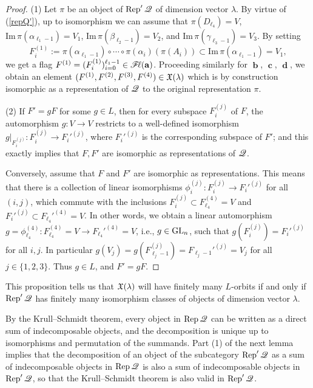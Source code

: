 \documentclass[12pt,reqno]{amsart}
\begin{document}
\begin{proof}
(1) Let $\pi$ be an object of $\Rep'\quiver$ of dimension vector $\lambda$.
By virtue of (\ref{repQ'}), up to isomorphism we can assume that $\pi(D_{\ell_4})=V$, $\mathrm{Im}\,\pi(\alpha_{\ell_1-1})=V_1$,
$\mathrm{Im}\,\pi(\beta_{\ell_2-1})=V_2$,
and $\mathrm{Im}\,\pi(\gamma_{\ell_3-1})=V_3$.
By setting
$$
F_i^{(1)}:=\pi(\alpha_{\ell_1-1})\circ\cdots\circ\pi(\alpha_i)(\pi(A_i))\subset\mathrm{Im}\,\pi(\alpha_{\ell_1-1})=V_1,
$$
we get a flag $F^{(1)}=(F_i^{(1)})_{i=0}^{\ell_1-1}\in\mathscr{F}\!\ell(\mathbf{a})$.
Proceeding similarly for $\mbfb$, $\mbfc$, $\mbfd$, we obtain an element $(F^{(1)},F^{(2)},F^{(3)},F^{(4)})\in\mathfrak{X}(\lambda)$ which is by construction isomorphic as a representation of $\mathscr{Q}$ to the original representation $\pi$.

(2)
If $F'=g F$ for some $g\in L$, then for every subspace $F_i^{(j)}$ of $F$,
the automorphism $g:V\to V$ restricts to a well-defined isomorphism $g|_{F_i^{(j)}}:F_i^{(j)}\to F_i'^{(j)}$,
where $F_i'^{(j)}$ is the corresponding subspace of $F'$;
and this exactly implies that $F,F'$ are isomorphic as representations of $\mathscr{Q}$.

Conversely, assume that $F$ and $F'$ are isomorphic as representations.
This means that there is a collection of linear isomorphisms
$\phi_i^{(j)}:F_i^{(j)}\to F_i'^{(j)}$ for all $(i,j)$,
which commute with the inclusions $F_i^{(j)}\subset F_{\ell_4}^{(4)}=V$ and $F_i'^{(j)}\subset F_{\ell_4}'^{(4)}=V$.
In other words, we obtain a linear automorphism $g=\phi_{\ell_4}^{(4)}:F_{\ell_4}^{(4)}=V\to F_{\ell_4}'^{(4)}=V$, i.e., $g\in \mathrm{GL}_n$,
such that $g(F_i^{(j)})=F_i'^{(j)}$ for all $i,j$.
In particular $g(V_j)=g(F_{\ell_j-1}^{(j)})=F_{\ell_j-1}'^{(j)}=V_j$ for all $j\in\{1,2,3\}$.
Thus $g\in L$, and $F'=g F$.
\end{proof}


This proposition tells us that $\mathfrak{X}(\lambda)$ will have finitely many $L$-orbits if and only if $\Rep'\quiver$ has finitely many isomorphism classes of objects of dimension vector $\lambda$.

By the Krull--Schmidt theorem, every object in $\Rep\quiver$ can be written as a direct sum of indecomposable objects, and the decomposition is unique up to isomorphisms and permutation of the summands.
Part (1) of the next lemma implies that the decomposition of an object of the subcategory $\Rep'\quiver$ as a sum of indecomposable objects in $\Rep\quiver$ is also a sum of indecomposable objects in $\Rep'\quiver$, so that the Krull--Schmidt theorem is also valid in $\Rep'\quiver$.
\end{document}
